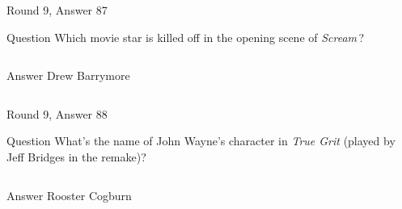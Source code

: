 \documentclass[11pt]{beamer}
\begin{document}
\begin{frame}[t]{Round 9, Answer 87}
\vspace{2em}
\begin{block}{Question}
Which movie star is killed off in the opening scene of \emph{Scream}\,?
\end{block}
\pause{}
\begin{columns}[T,totalwidth=\linewidth]
\begin{column}{0.35\linewidth}
\begin{block}{Answer}
Drew Barrymore
\end{block}
\end{column}
\begin{column}{0.6\linewidth}
\begin{center}
\texttt{[image: \{Images/barrymore]}.jpg}
\end{center}
\end{column}
\end{columns}
\end{frame}
    

\begin{frame}[t]{Round 9, Answer 88}
\vspace{2em}
\begin{block}{Question}
What's the name of John Wayne's character in \emph{True Grit} (played by Jeff Bridges in the remake)?
\end{block}
\pause{}
\begin{columns}[T,totalwidth=\linewidth]
\begin{column}{0.35\linewidth}
\begin{block}{Answer}
Rooster Cogburn
\end{block}
\end{column}
\begin{column}{0.6\linewidth}
\begin{center}
\texttt{[image: \{Images/cogburn]}.jpeg}
\end{center}
\end{column}
\end{columns}
\end{frame}
    
\end{document}

